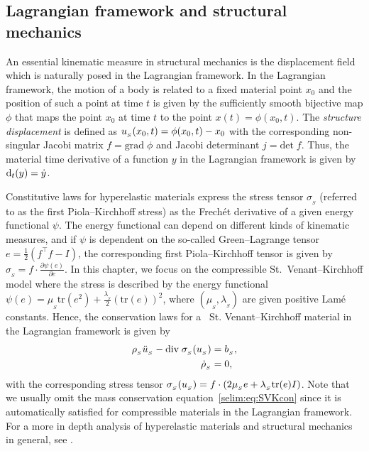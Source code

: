 \subsection{ Lagrangian framework and structural mechanics}

An essential kinematic measure in structural mechanics is the
displacement field which is naturally posed in the Lagrangian
framework.  In the Lagrangian framework, the motion of a body is
related to a fixed material point $x_0$ and the position of
such a point at time $t$ is given by the sufficiently smooth bijective
map $\phi$ that maps the point $x_0$ at time $t$ to the point $x(t)=
\phi(x_0,t)$. The \emph{structure displacement} is defined as
$u_{_{S}}(x_0,t) = \phi(x_0, t) - x_0$ with the corresponding non-singular
Jacobi matrix $f = \textrm{grad}\;\phi$ and Jacobi determinant $j =
\textrm{det}\; f$. Thus, the material time derivative of a function $y$
in the Lagrangian framework is given by $\textrm{d}_t(y) = \dot{y}$.

Constitutive laws for hyperelastic materials express the stress tensor
$\sigma_{_{S}}$ (referred to as the first Piola--Kirchhoff stress)
as the Frech\'{e}t derivative of a given energy functional $\psi$.
The energy functional can depend on different kinds of kinematic measures,
and if $\psi$ is dependent on the so-called Green--Lagrange tensor $e=
\tfrac{1}{2}(f^{\top}f -I)$, the corresponding first Piola--Kirchhoff
tensor is given by $\sigma_{_{S}} = f\cdot\frac{\partial \psi(e)}{\partial
e}$. In this chapter, we focus on the compressible St.~Venant--Kirchhoff
model where the stress is described by the energy functional $\psi(e) =
\mu_{_{S}}\textrm{tr}(e^2) + \frac{\lambda_{_{S}}}{2}(\textrm{tr}(e))^2$,
where $(\mu_{_{S}},\lambda_{_{S}})$ are given positive Lam\'{e}
constants. Hence, the conservation laws for a ~St. Venant--Kirchhoff
material in the Lagrangian framework is given by
\begin{align}
\label{selim:eq:SVKmom}
\rho_{_{S}} \ddot{u}_{_{S}} - \textrm{div}\;\sigma_{_{S}}(u_{_{S}}) &= b_{_{S}},
\\
\label{selim:eq:SVKcon}
\dot{\rho}_{_{S}}&=0,
\end{align}
with the corresponding stress tensor $\sigma_{_{S}}(u_{_{S}}) = f\cdot(2\mu_{_{S}}e
+ \lambda_{_{S}} \textrm{tr}(e)I)$.  Note that we usually omit the mass
conservation equation~\eqref{selim:eq:SVKcon} since it is automatically
satisfied for compressible materials in the Lagrangian framework.  For a
more in depth analysis of hyperelastic materials and structural mechanics
in general, see \citet{Gurtin1981,Holzapfel2000}.

